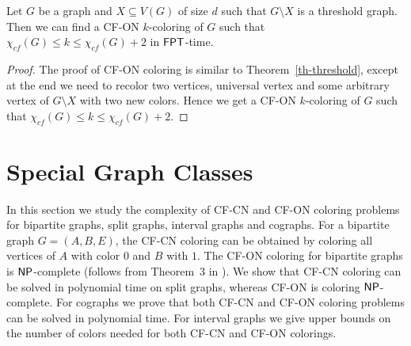 \documentclass[svgnames]{llncs}
\newcommand{\NP}{\ensuremath{\sf{NP}}\xspace}
\newcommand{\fpt}{\ensuremath{\sf{FPT}}\xspace}
\newcommand{\cfcn}{\textsc {CF-CN}}
\newcommand{\cfon}{\textsc {CF-ON}}
\begin{document}
\begin{corollary}
Let $G$ be a graph and $X \subseteq V(G)$ of size $d$ such that $G \setminus X$ is a threshold graph. Then we can find a \cfon{} $k$-coloring of $G$ such that  $\chi_{cf}(G) \leq k \leq \chi_{cf}(G)+2$ in $\fpt$-time.
\end{corollary}
\begin{proof}
The proof of \cfon{} coloring is similar to Theorem~\ref{th-threshold}, except at the end we need to recolor two vertices, universal vertex and some arbitrary vertex of $G \setminus X$ with two new colors. Hence we get a \cfon{} $k$-coloring of $G$ such that  $\chi_{cf}(G) \leq k \leq \chi_{cf}(G)+2$. 
\end{proof}

\section{Special Graph Classes}
In this section we study the complexity of \cfcn{} and \cfon{} coloring problems for bipartite graphs, split graphs, interval graphs and cographs. For a bipartite graph $G=(A,B,E)$, the \cfcn{} coloring can be obtained by coloring all vertices of $A$ with color $0$ and $B$ with $1$. The \cfon{} coloring for bipartite graphs is $\NP$-complete (follows from Theorem~3 in \cite{gargano2015complexity}). We show that \cfcn{} coloring can be solved in polynomial time on split graphs, whereas \cfon{} is coloring $\NP$-complete. For cographs we prove that both \cfcn{} and \cfon{} coloring problems can be solved in polynomial time. For interval graphs we give upper bounds on the number of colors needed for both \cfcn{} and \cfon{} colorings. 
\end{document}
